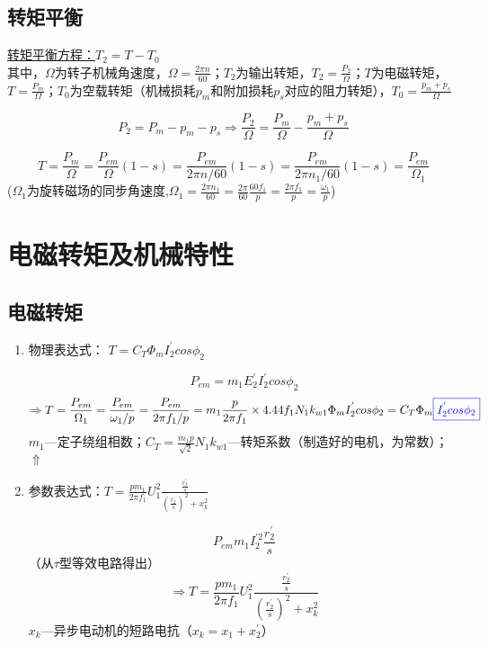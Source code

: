 \documentclass[blue]{elegantnote}
\begin{document}
\newpage
\subsection{转矩平衡}
\underline{转矩平衡方程：$T_2=T-T_0$}
\\其中，$\Omega$为转子机械角速度，$\Omega=\frac{2\pi n}{60}$；$T_2$为输出转矩，$T_2=\frac{P_2}{\Omega}$；$T$为电磁转矩，$T=\frac{P_m}{\Omega}$；$T_0$为空载转矩（机械损耗$p_m$和附加损耗$p_s$对应的阻力转矩），$T_0=\frac{p_m+p_s}{\Omega}$
\\
\begin{newproof}
	$$P_2=P_m-p_m-p_s\Rightarrow \boxed{\frac{P_2}{\Omega}=\frac{P_m}{\Omega}-\frac{p_m+p_s}{\Omega}}$$
\end{newproof}
\begin{note}
	$$\boxed{T=\frac{P_m}{\Omega}}=\frac{P_{em}}{\Omega}(1-s)=\frac{P_{em}}{2\pi n/60}(1-s)=\frac{P_{em}}{2\pi n_1/60}(1-s)\boxed{=\frac{P_{em}}{\Omega_1}}$$
	($\Omega_1$为旋转磁场的同步角速度,$\Omega_1=\frac{2\pi n_1}{60}=\frac{2\pi}{60}\frac{60f_1}{p}=\frac{2\pi f_1}{p}=\frac{\omega_1}{p}$)
\end{note}

\section{电磁转矩及机械特性}
\subsection{电磁转矩}
\begin{enumerate}
	\item 物理表达式：
	$\boxed{T=C_T\Phi_m{I_2^{'}cos\phi_2}}$
	\begin{note}
		$$P_{em}=m_1E_2^{'}I_2^{'}cos\phi_2$$
		$$\Rightarrow T=\frac{P_{em}}{\Omega_1}=\frac{P_{em}}{\omega_1/p}=\frac{P_{em}}{2\pi f_1/p}=m_1\frac{p}{2\pi f_1}\times 4.44f_1N_1k_{w1}\Phi_mI_2^{'}cos\phi_2=C_T\Phi_m{\color{blue}\boxed{I_2^{'}cos\phi_2}}$$
		$m_1$—定子绕组相数；$C_T=\frac{m_1p}{\sqrt{2}}N_1k_{w1}$—转矩系数{\color{thid}（制造好的电机，为常数）}；{\color{blue}$\Uparrow$}
		\\{}
	\end{note}
	\item 参数表达式：$ \boxed{ T=\frac{pm_1}{2\pi f_1}U_1^{2}\frac{\frac{r_2^{'}}{s}}{({\frac{r_2^{'}}{s}})^2+x_k^{2}}}$
	\begin{note}
		$$P_{em}m_1I_2^{'2}\frac{r_2^{'}}{s}$$
		（从$\tau$型等效电路得出）
		$$\Rightarrow T=\frac{pm_1}{2\pi f_1}U_1^{2}\frac{\frac{r_2^{'}}{s}}{({\frac{r_2^{'}}{s}})^2+x_k^{2}}$$
		$x_k$—异步电动机的短路电抗（$x_k=x_1+x_2^{'}$）
	\end{note}
\end{enumerate}
\end{document}
